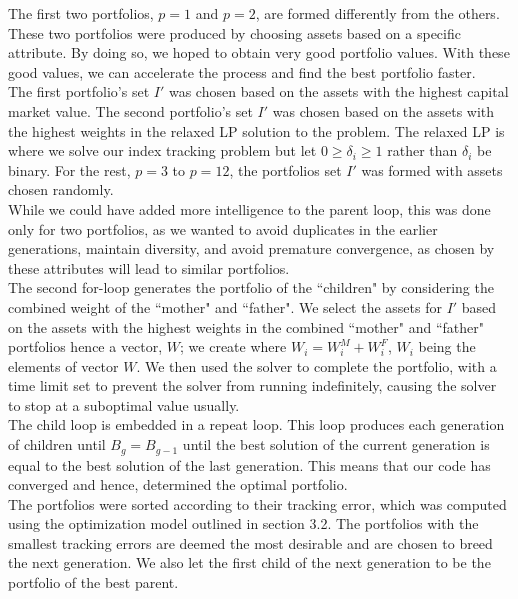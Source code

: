 \documentclass[12pt]{report}
\begin{document}
\noindent
The first two portfolios, $p=1$ and $p=2$, are formed differently from the others. These two portfolios were produced by choosing assets based on a specific attribute. By doing so, we hoped to obtain very good portfolio values. With these good values, we can accelerate the process and find the best portfolio faster. \\ \newline
\noindent
The first portfolio's set $I'$ was chosen based on the assets with the highest capital market value. The second portfolio's set $I'$ was chosen based on the assets with the highest weights in the relaxed LP solution to the problem. The relaxed LP is where we solve our index tracking problem but let $0 \geq \delta_i \geq 1$ rather than $\delta_i$ be binary.
For the rest, $p = 3$ to $p=12$, the portfolios set $I'$ was formed with assets chosen randomly.\\ \newline
\noindent
While we could have added more intelligence to the parent loop, this was done only for two portfolios, as we wanted to avoid duplicates in the earlier generations, maintain diversity, and avoid premature convergence, as chosen by these attributes will lead to similar portfolios.\\ \newline
\noindent 
The second for-loop generates the portfolio of the ``children" by considering the combined weight of the ``mother" and ``father". We select the assets for $I'$ based on the assets with the highest weights in the combined ``mother" and ``father" portfolios hence a vector, $W$; we create where $W_i= W_i^M + W_i^F$, $W_i$ being the elements of vector $W$. We then used the solver to complete the portfolio, with a time limit set to prevent the solver from running indefinitely, causing the solver to stop at a suboptimal value usually. \\ \newline
\noindent
The child loop is embedded in a repeat loop. This loop produces each generation of children until $B_g = B_{g-1}$ until the best solution of the current generation is equal to the best solution of the last generation. This means that our code has converged and hence, determined the optimal portfolio.\\ \newline 
\noindent
The portfolios were sorted according to their tracking error, which was computed using the optimization model outlined in section 3.2. The portfolios with the smallest tracking errors are deemed the most desirable and are chosen to breed the next generation. We also let the first child of the next generation to be the portfolio of the best parent.
\end{document}
